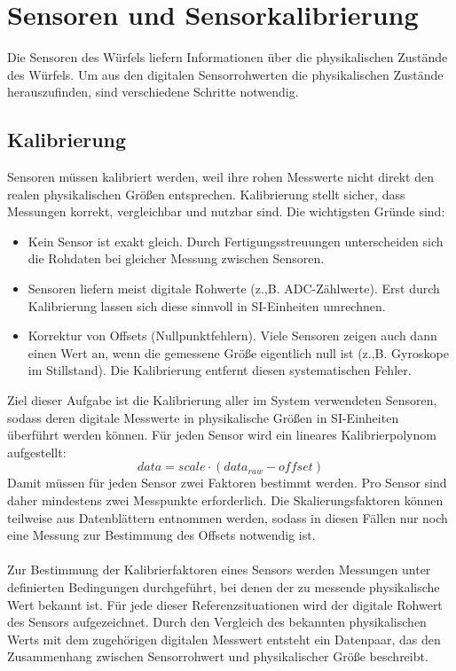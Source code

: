 \chapter{Sensoren und Sensorkalibrierung}
    \label{ch:Sensorcalib}
    Die Sensoren des Würfels liefern Informationen über die physikalischen Zustände des Würfels. Um aus den digitalen  Sensorrohwerten die physikalischen Zustände herauszufinden, sind verschiedene Schritte notwendig.

    \section{Kalibrierung}
        Sensoren müssen kalibriert werden, weil ihre rohen Messwerte nicht direkt den realen physikalischen Größen entsprechen. Kalibrierung stellt sicher, dass Messungen korrekt, vergleichbar und nutzbar sind. Die wichtigsten Gründe sind:
        \begin{itemize}
            \item Kein Sensor ist exakt gleich. Durch Fertigungsstreuungen unterscheiden sich die Rohdaten bei gleicher Messung zwischen Sensoren.
            \item Sensoren liefern meist digitale Rohwerte (z.,B. ADC-Zählwerte). Erst durch Kalibrierung lassen sich diese sinnvoll in SI-Einheiten umrechnen.
            \item Korrektur von Offsets (Nullpunktfehlern). Viele Sensoren zeigen auch dann einen Wert an, wenn die gemessene Größe eigentlich null ist (z.,B. Gyroskope im Stillstand). Die Kalibrierung entfernt diesen systematischen Fehler.
        \end{itemize}
        Ziel dieser Aufgabe ist die Kalibrierung aller im System verwendeten Sensoren, sodass deren digitale Messwerte in physikalische Größen in SI-Einheiten überführt werden können. Für jeden Sensor wird ein lineares Kalibrierpolynom aufgestellt:
        \[
            data = scale\cdot (data_{raw} - offset)
        \]
        Damit müssen für jeden Sensor zwei Faktoren bestimmt werden. Pro Sensor sind daher mindestens zwei Messpunkte erforderlich. Die Skalierungsfaktoren können teilweise aus Datenblättern entnommen werden, sodass in diesen Fällen nur noch eine Messung zur Bestimmung des Offsets notwendig ist.\\
        \\
        Zur Bestimmung der Kalibrierfaktoren eines Sensors werden Messungen unter definierten Bedingungen durchgeführt, bei denen der zu messende physikalische Wert bekannt ist. Für jede dieser Referenzsituationen wird der digitale Rohwert des Sensors aufgezeichnet. Durch den Vergleich des bekannten physikalischen Werts mit dem zugehörigen digitalen Messwert entsteht ein Datenpaar, das den Zusammenhang zwischen Sensorrohwert und physikalischer Größe beschreibt.\\
